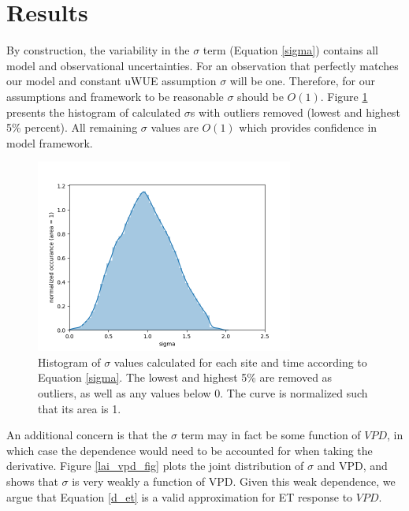 \documentclass[draft,linenumbers]{agujournal}
\begin{document}
\section{Results}
\label{results}

By construction, the variability in the $\sigma$ term (Equation \ref{sigma}) contains all model and observational uncertainties. For an observation that perfectly matches our model and constant uWUE assumption $\sigma$ will be one. Therefore, for our assumptions and framework to be reasonable $\sigma$ should be $O(1)$. Figure \ref{lai_fig} presents the histogram of calculated $\sigma$s with outliers removed (lowest and highest 5\% percent). All remaining $\sigma$ values are $O(1)$ which provides confidence in model framework.

\begin{figure}[h]
\centering
\includegraphics[width=20pc]{./fig02.png}
\caption{Histogram of $\sigma$ values calculated for each site and time according to Equation \ref{sigma}. The lowest and highest 5\% are removed as outliers, as well as any values below 0. The curve is normalized such that its area is 1. }
\label{lai_fig}
\end{figure}

An additional concern is that the $\sigma$ term may in fact be some function of $VPD$, in which case the dependence would need to be accounted for when taking the derivative. Figure \ref{lai_vpd_fig} plots the joint distribution of $\sigma$ and VPD, and shows that $\sigma$ is very weakly a function of VPD. Given this weak dependence, we argue that Equation \ref{d_et} is a valid approximation for ET response to $VPD$.
\end{document}
